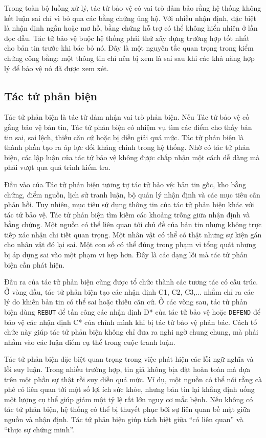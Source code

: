 ﻿\documentclass[oneside,a4paper,12pt]{extreport}
\begin{document}
Trong toàn bộ luồng xử lý, tác tử bảo vệ có vai trò đảm bảo rằng hệ thống không kết luận sai chỉ vì bỏ qua các bằng chứng ủng hộ. Với nhiều nhận định, đặc biệt là nhận định ngắn hoặc mơ hồ, bằng chứng hỗ trợ có thể không hiển nhiên ở lần đọc đầu. Tác tử bảo vệ buộc hệ thống phải thử xây dựng trường hợp tốt nhất cho bản tin trước khi bác bỏ nó. Đây là một nguyên tắc quan trọng trong kiểm chứng công bằng: một thông tin chỉ nên bị xem là sai sau khi các khả năng hợp lý để bảo vệ nó đã được xem xét.

\subsection{Tác tử phản biện}

Tác tử phản biện là tác tử đảm nhận vai trò phản biện. Nếu Tác tử bảo vệ cố gắng bảo vệ bản tin, Tác tử phản biện có nhiệm vụ tìm các điểm cho thấy bản tin sai, sai lệch, thiếu căn cứ hoặc bị diễn giải quá mức. Tác tử phản biện là thành phần tạo ra áp lực đối kháng chính trong hệ thống. Nhờ có tác tử phản biện, các lập luận của tác tử bảo vệ không được chấp nhận một cách dễ dàng mà phải vượt qua quá trình kiểm tra.

Đầu vào của Tác tử phản biện tương tự tác tử bảo vệ: bản tin gốc, kho bằng chứng, điểm nguồn, lịch sử tranh luận, bộ quản lý nhận định và các mục tiêu cần phản hồi. Tuy nhiên, mục tiêu sử dụng thông tin của tác tử phản biện khác với tác tử bảo vệ. Tác tử phản biện tìm kiếm các khoảng trống giữa nhận định và bằng chứng. Một nguồn có thể liên quan tới chủ đề của bản tin nhưng không trực tiếp xác nhận chi tiết quan trọng. Một nhân vật có thể có thật nhưng sự kiện gán cho nhân vật đó lại sai. Một con số có thể đúng trong phạm vi tổng quát nhưng bị áp dụng sai vào một phạm vi hẹp hơn. Đây là các dạng lỗi mà tác tử phản biện cần phát hiện.

Đầu ra của tác tử phản biện cũng được tổ chức thành các tương tác có cấu trúc. Ở vòng đầu, tác tử phản biện tạo các nhận định C1, C2, C3,... nhằm chỉ ra các lý do khiến bản tin có thể sai hoặc thiếu căn cứ. Ở các vòng sau, tác tử phản biện dùng \texttt{REBUT} để tấn công các nhận định D* của tác tử bảo vệ hoặc \texttt{DEFEND} để bảo vệ các nhận định C* của chính mình khi bị tác tử bảo vệ phản bác. Cách tổ chức này giúp tác tử phản biện không chỉ đưa ra nghi ngờ chung chung, mà phải nhắm vào các luận điểm cụ thể trong cuộc tranh luận.

Tác tử phản biện đặc biệt quan trọng trong việc phát hiện các lỗi ngữ nghĩa và lỗi suy luận. Trong nhiều trường hợp, tin giả không bịa đặt hoàn toàn mà dựa trên một phần sự thật rồi suy diễn quá mức. Ví dụ, một nguồn có thể nói rằng cà phê có liên quan tới một số lợi ích sức khỏe, nhưng bản tin lại khẳng định uống một lượng cụ thể giúp giảm một tỷ lệ rất lớn nguy cơ mắc bệnh. Nếu không có tác tử phản biện, hệ thống có thể bị thuyết phục bởi sự liên quan bề mặt giữa nguồn và nhận định. Tác tử phản biện giúp tách biệt giữa ``có liên quan'' và ``thực sự chứng minh''.
\end{document}
